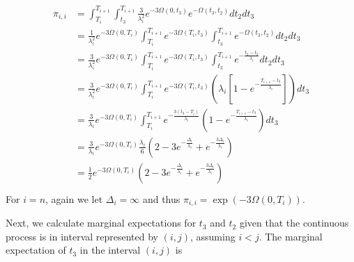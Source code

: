\documentclass{article}
\begin{document}
\begin{align}
    \begin{split}
    \pi_{i,i} &= \int_{T_i}^{T_{i+1}}\int_{t_3}^{T_{i+1}}
    \frac{3}{\lambda_i^2}e^{-3\Omega(0,t_3)}e^{-\Omega(t_3,t_2)}dt_2dt_3\\
    &= \frac{1}{\lambda_i^2}e^{-3\Omega(0,T_i)}\int_{T_i}^{T_{i+1}}
    e^{-3\Omega(T_i,t_3)}\int_{t_3}^{T_{i+1}}e^{-\Omega(t_3,t_2)}dt_2dt_3\\
    &= \frac{3}{\lambda_i^2}e^{-3\Omega(0,T_i)}\int_{T_i}^{T_{i+1}}
    e^{-3\Omega(T_i,t_3)}\int_{t_3}^{T_{i+1}}e^{-\frac{t_2-t_3}{\lambda_i}}dt_2dt_3\\
    &= \frac{3}{\lambda_i^2}e^{-3\Omega(0,T_i)}\int_{T_i}^{T_{i+1}}
    e^{-3\Omega(T_i,t_3)}\left(\lambda_i\left[1-e^{-\frac{T_{i+1}-t_3}{\lambda_i}}\right]\right)dt_3\\
    &= \frac{3}{\lambda_i}e^{-3\Omega(0,T_i)}\int_{T_i}^{T_{i+1}}
    e^{-\frac{3(t_3-T_i)}{\lambda_i}}\left(1-e^{-\frac{T_{i+1}-t_3}{\lambda_i}}\right)dt_3\\
    &= \frac{3}{\lambda_i}e^{-3\Omega(0,T_i)}
    \frac{\lambda_i}{6}\left(2-3e^{-\frac{\Delta_i}{\lambda_i}}+e^{-\frac{3\Delta_i}{\lambda_i}}\right)\\
    &= \frac{1}{2}e^{-3\Omega(0,T_i)}
    \left(2-3e^{-\frac{\Delta_i}{\lambda_i}}+e^{-\frac{3\Delta_i}{\lambda_i}}\right)\\
    \end{split}
\end{align}
For $i = n$, again we let $\Delta_i = \infty$ and thus $\pi_{i,i} = \exp(-3\Omega(0,T_i))$.

Next, we calculate marginal expectations for $t_3$ and $t_2$ given that the
continuous process is in interval represented by $(i,j)$, assuming $i<j$. The
marginal expectation of $t_3$ in the interval $(i,j)$ is 
\end{document}
